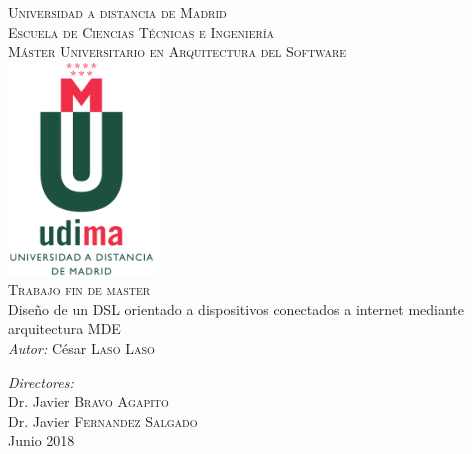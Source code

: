 \thispagestyle{empty}
\begin{center}

    \textsc{\Large Universidad a distancia de Madrid}\\
    \textsc{\Large Escuela de Ciencias Técnicas e Ingeniería}\\[1.0cm] 
    \textsc{\Large Máster Universitario en Arquitectura del Software}\\[1.5cm] 

    \includegraphics[width=40mm]{images/udima_logo.pdf}\\[1.5cm]
    
    \textsc{\LARGE{Trabajo fin de master}}\\[1.0cm]
    \Large{Diseño de un DSL orientado a dispositivos conectados a internet mediante arquitectura MDE}\\[1.2cm] 
    
    
    \emph{Autor:}  César \textsc{Laso Laso}
    
    \emph{Directores:} \\
    Dr. Javier \textsc{Bravo Agapito}\\
    Dr. Javier \textsc{Fernandez Salgado}\\[1.0cm]
    
    Junio 2018\\[0cm] %

    \vfill 

  \end{center}
  